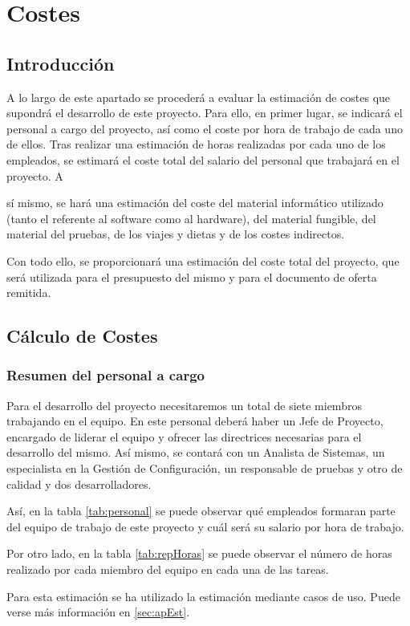 
\chapter{Costes}
\clearpage

\section{Introducción}
\par A lo largo de este apartado se procederá a evaluar la estimación de costes que supondrá el desarrollo de este proyecto. Para ello, en primer lugar, se indicará el personal a cargo del proyecto, así como el coste por hora de trabajo de cada uno de ellos. Tras realizar una estimación de horas realizadas por cada uno de los empleados, se estimará el coste total del salario del personal que trabajará en el proyecto.
A\par sí mismo, se hará una estimación del coste del material informático utilizado (tanto el referente al software como al hardware), del material fungible, del material del pruebas, de los viajes y dietas y de los costes indirectos.
\par Con todo ello, se proporcionará una estimación del coste total del proyecto, que será utilizada para el presupuesto del mismo y para el documento de oferta remitida.

\section{Cálculo de Costes}

\subsection{Resumen del personal a cargo}
\par Para el desarrollo del proyecto necesitaremos un total de siete miembros trabajando en el equipo. En este personal deberá haber un Jefe de Proyecto, encargado de liderar el equipo y ofrecer las directrices necesarias para el desarrollo del mismo. Así mismo, se contará con un Analista de Sistemas, un especialista en la Gestión de Configuración, un responsable de pruebas y otro de calidad y dos desarrolladores.
\par Así, en la tabla \ref{tab:personal} se puede observar qué empleados formaran parte del equipo de trabajo de este proyecto y cuál será su salario por hora de trabajo.
\par Por otro lado, en la tabla \ref{tab:repHoras} se puede observar el número de horas realizado por cada miembro del equipo en cada una de las tareas.
\par Para esta estimación se ha utilizado la estimación mediante casos de uso. Puede verse más información en \ref{sec:apEst}.

